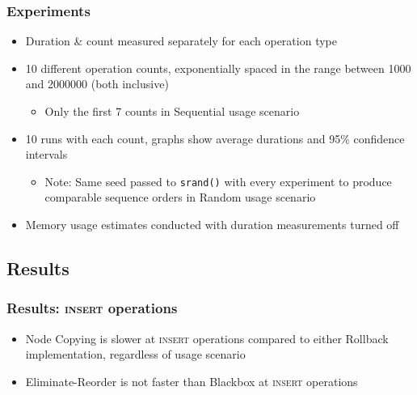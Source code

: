 \documentclass{beamer}
\begin{document}
\begin{frame}
\frametitle{Experiments}
\begin{itemize}

  \item Duration \& count measured separately for each operation type

  \item 10 different operation counts, exponentially spaced in the range between
  1000 and 2000000 (both inclusive)

  \begin{itemize}

    \item Only the first 7 counts in Sequential usage scenario

  \end{itemize}

  \item 10 runs with each count, graphs show average durations and 95\%
  confidence intervals

  \begin{itemize}

    \item Note: Same seed passed to \texttt{srand()} with every experiment to
    produce comparable sequence orders in Random usage scenario

  \end{itemize}

  \item Memory usage estimates conducted with duration measurements turned off

\end{itemize}
\end{frame}

\subsection{Results}

\begin{frame}
\frametitle{Results: \textsc{insert} operations}
\begin{itemize}

  \item Node Copying is slower at \textsc{insert} operations compared to either
  Rollback implementation, regardless of usage scenario

  \item Eliminate-Reorder is not faster than Blackbox at \textsc{insert}
  operations

\end{itemize}
\end{frame}
\end{document}
